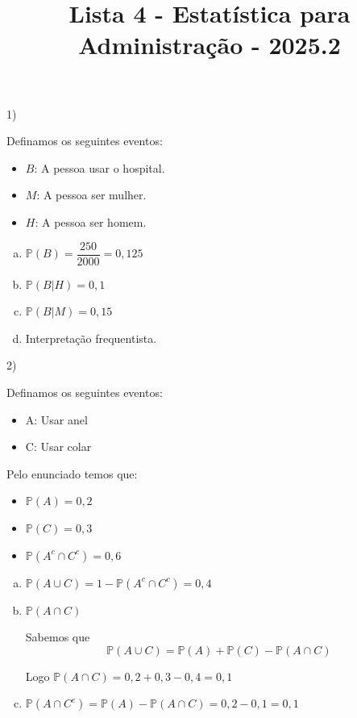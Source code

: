 \documentclass[12pt]{article}
\title{Lista 4 - Estatística para Administração - 2025.2}
\begin{document}
\date{}
\maketitle

1)

 Definamos os seguintes eventos: 

     \begin{itemize}
        \item $B$: A pessoa usar o hospital. 
        \item $M$: A pessoa ser mulher.
        \item $H$: A pessoa ser homem.
    \end{itemize}

\begin{enumerate}[a)] %
    \item $\mathds{P}(B) = \dfrac{250}{2000} = 0,125$
    \item $\mathds{P}(B|H) =  0,1$
    \item $\mathds{P}(B|M) = 0,15$
    \item Interpretação frequentista. 
\end{enumerate}

\vspace{5px}

2) 

Definamos os seguintes eventos:

\begin{itemize}
    \item A: Usar anel
    \item C: Usar colar
\end{itemize}

Pelo enunciado temos que:

\begin{itemize}
    \item $\mathds{P}(A) = 0,2$
    \item $\mathds{P}(C) = 0,3$
    \item $\mathds{P}(A^c \cap C^c) = 0,6$
\end{itemize}


\begin{enumerate}[a)] %
    \item $ \mathds{P}(A \cup C) =  1 -  \mathds{P}(A^c \cap C^c)  = 0,4$
    \item $\mathds{P}(A \cap C) $
    
    Sabemos que $$ \mathds{P}(A \cup C) = \mathds{P}(A) + \mathds{P}(C) -\mathds{P}(A \cap C)$$

    Logo $\mathds{P}(A \cap C)  = 0,2  + 0,3 - 0,4 = 0,1$
    \item $\mathds{P}(A \cap C^c) = \mathds{P}(A) - \mathds{P}(A \cap C) = 0,2 - 0,1 = 0,1$
\end{enumerate}
\end{document}
